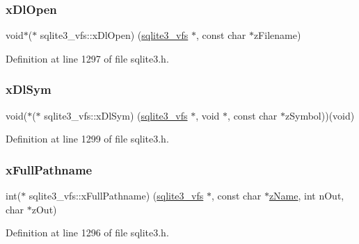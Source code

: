 \mbox{\label{structsqlite3__vfs_a4de0324cd74c8ec98e4605d432f16e0a}} 
\subsubsection{\texorpdfstring{x\+Dl\+Open}{xDlOpen}}
{\footnotesize\ttfamily void$\ast$($\ast$ sqlite3\+\_\+vfs\+::x\+Dl\+Open) (\mbox{\hyperlink{structsqlite3__vfs}{sqlite3\+\_\+vfs}} $\ast$, const char $\ast$z\+Filename)}



Definition at line 1297 of file sqlite3.\+h.

\mbox{\label{structsqlite3__vfs_a847ba7d9a80164138031aacef1d01507}} 
\subsubsection{\texorpdfstring{x\+Dl\+Sym}{xDlSym}}
{\footnotesize\ttfamily void($\ast$($\ast$ sqlite3\+\_\+vfs\+::x\+Dl\+Sym) (\mbox{\hyperlink{structsqlite3__vfs}{sqlite3\+\_\+vfs}} $\ast$, void $\ast$, const char $\ast$z\+Symbol))(void)}



Definition at line 1299 of file sqlite3.\+h.

\mbox{\label{structsqlite3__vfs_ae6573ffda4c4f014960b0ec3a1522dfa}} 
\subsubsection{\texorpdfstring{x\+Full\+Pathname}{xFullPathname}}
{\footnotesize\ttfamily int($\ast$ sqlite3\+\_\+vfs\+::x\+Full\+Pathname) (\mbox{\hyperlink{structsqlite3__vfs}{sqlite3\+\_\+vfs}} $\ast$, const char $\ast$\mbox{\hyperlink{structsqlite3__vfs_a0f06a27ac2201ea04c0623ef19e5d73e}{z\+Name}}, int n\+Out, char $\ast$z\+Out)}



Definition at line 1296 of file sqlite3.\+h.

